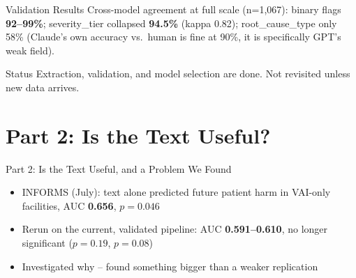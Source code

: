 \documentclass[aspectratio=169,10pt]{beamer}
\newcommand{\highlight}[1]{{\color{ncsuRed}\textbf{#1}}}
\begin{document}
\begin{frame}{Validation Results}
\vspace{10pt}
Cross-model agreement at full scale (n=1,067): binary flags \highlight{92--99\%};
severity\_tier collapsed \highlight{94.5\%} (kappa 0.82); root\_cause\_type only
58\% (Claude's own accuracy vs.\ human is fine at 90\%, it is specifically GPT's
weak field).
\vspace{6pt}
\begin{alertblock}{Status}
\small Extraction, validation, and model selection are done. Not revisited unless new
data arrives.
\end{alertblock}
\end{frame}

\section{Part 2: Is the Text Useful?}

\begin{frame}{Part 2: Is the Text Useful, and a Problem We Found}
\begin{itemize}
  \setlength{\itemsep}{10pt}
  \item INFORMS (July): text alone predicted future patient harm in VAI-only
        facilities, AUC \highlight{0.656}, $p{=}0.046$
  \item Rerun on the current, validated pipeline: AUC \highlight{0.591--0.610},
        no longer significant ($p{=}0.19$, $p{=}0.08$)
  \item Investigated why -- found something bigger than a weaker replication
\end{itemize}
\end{frame}
\end{document}
